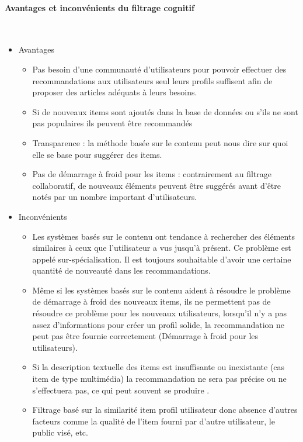 \documentclass[a4paper,12pt,letterpaper,headsepline,singlespacing,headsepline, french]{report}
\newcommand{\myparagraph}[1]{\paragraph*{#1}\mbox{}\\\indent}
\begin{document}
 \myparagraph{Avantages et inconvénients du filtrage cognitif}

\begin{itemize}
	\item Avantages 
	\begin{itemize}
		\item Pas besoin d’une communauté d’utilisateurs pour pouvoir effectuer des recommandations aux utilisateurs seul leurs profils suffisent afin de proposer des articles adéquats à leurs besoins. 
		\item Si de nouveaux items sont ajoutés dans la base de données ou s’ils ne sont pas populaires ils peuvent être recommandés 
		\item Transparence : la méthode basée sur le contenu peut nous dire sur quoi elle se base pour suggérer des items.
		\item Pas de démarrage à froid pour les items : contrairement au filtrage collaboratif, de nouveaux éléments peuvent être suggérés avant d'être notés par un nombre important d'utilisateurs.
	\end{itemize}
	\item Inconvénients
		\begin{itemize}
		\item Les systèmes basés sur le contenu ont tendance à rechercher des éléments similaires à ceux que l'utilisateur a vus jusqu'à présent. Ce problème est appelé sur-spécialisation. Il est toujours souhaitable d’avoir une certaine quantité de nouveauté dans les recommandations. \cite{ref3}
		\item Même si les systèmes basés sur le contenu aident à résoudre le problème de démarrage à froid des nouveaux items, ils ne permettent pas de résoudre ce problème pour les nouveaux utilisateurs, lorsqu'il n'y a pas assez d'informations pour créer un profil solide, la recommandation ne peut pas être fournie correctement (Démarrage à froid pour les utilisateurs). \cite{ref7}
		\item Si la description textuelle des items est insuffisante ou inexistante (cas item de type multimédia) la recommandation ne sera pas précise ou ne s’effectuera pas, ce qui peut souvent se produire .\cite{ref7}
		\item Filtrage basé sur la similarité item profil utilisateur donc absence d’autres facteurs comme la qualité de l’item fourni par d’autre utilisateur, le public visé, etc.
		
	\end{itemize}
\end{itemize}
\end{document}

